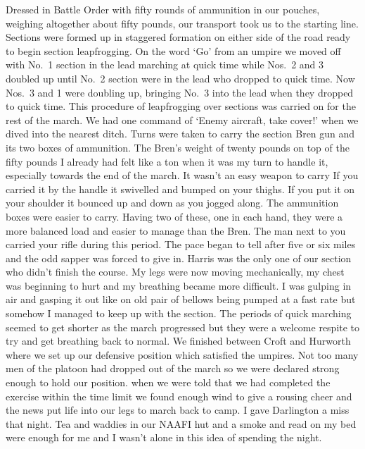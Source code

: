 Dressed in Battle Order with fifty rounds of ammunition in our
pouches, weighing altogether about fifty pounds, our transport took us
to the starting line. Sections were formed up in staggered formation
on either side of the road ready to begin section leapfrogging. On
the word `Go' from an umpire we moved off with No.~1 section in the
lead marching at quick time while Nos.~2 and 3 doubled up until No.~2
section were in the lead who dropped to quick time. Now Nos.~3 and 1
were doubling up, bringing No.~3 into the lead when they dropped to
quick time. This procedure of leapfrogging over sections was carried
on for the rest of the march.  We had one command of `Enemy aircraft,
take cover!' when we dived into the nearest ditch. Turns were taken to
carry the section Bren gun and its two boxes of ammunition. The Bren's
weight of twenty pounds on top of the fifty pounds I already had felt
like a ton when it was my turn to handle it, especially towards the
end of the march. It wasn't an easy weapon to carry If you carried it
by the handle it swivelled and bumped on your thighs. If you put it on
your shoulder it bounced up and down as you jogged along. The
ammunition boxes were easier to carry. Having two of these, one in
each hand, they were a more balanced load and easier to manage than
the Bren. The man next to you carried your rifle during this
period. The pace began to tell after five or six miles and the odd
sapper was forced to give in. \Sapper Harris was the only one of our
section who didn't finish the course. My legs were now moving
mechanically, my chest was beginning to hurt and my breathing became
more difficult. I was gulping in air and gasping it out like on old
pair of bellows being pumped at a fast rate but somehow I managed to
keep up with the section. The periods of quick marching seemed to get
shorter as the march progressed but they were a welcome respite to try
and get breathing back to normal. We finished between Croft and
Hurworth where we set up our defensive position which satisfied the
umpires. Not too many men of the platoon had dropped out of the march
so we were declared strong enough to hold our position. when we were
told that we had completed the exercise within the time limit we found
enough wind to give a rousing cheer and the news put life into our
legs to march back to camp. I gave Darlington a miss that night. Tea
and waddies in our NAAFI hut and a smoke and read on my bed were
enough for me and I wasn't alone in this idea of spending the night.

